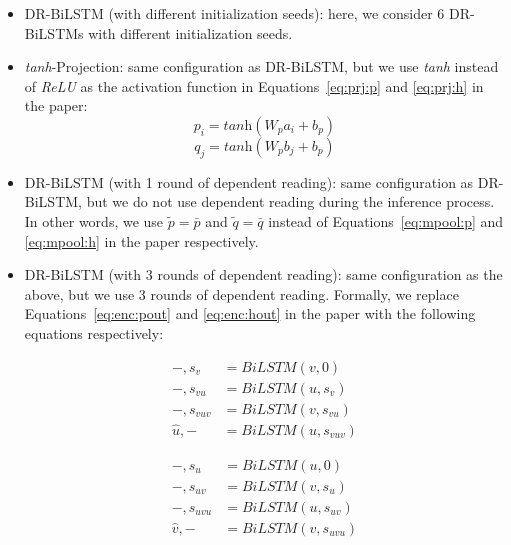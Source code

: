 \documentclass[11pt,a4paper]{article}
\begin{document}
	\begin{itemize}
		\item DR-BiLSTM (with different initialization seeds): here, we consider 6 DR-BiLSTMs with different initialization seeds.
		
		\item \emph{tanh}-Projection:  same configuration as DR-BiLSTM, but we use \emph{tanh} instead of \emph{ReLU} as the activation function in Equations~\ref{eq:prj:p} and \ref{eq:prj:h} in the paper:
		\begin{equation}
		p_i =  \textit{tanh}(W_p a_i + b_p)
		\end{equation}
		\begin{equation}
		q_j =  \textit{tanh}(W_p b_j + b_p)
		\end{equation}
		
		\item DR-BiLSTM (with 1 round of dependent reading): same configuration as DR-BiLSTM, but we do not use dependent reading during the inference process. In other words, we use $\tilde{p} = \bar{p}$ and $\tilde{q} = \bar{q}$ instead of Equations~\ref{eq:mpool:p} and \ref{eq:mpool:h} in the paper respectively.
		
		\item DR-BiLSTM (with 3 rounds of dependent reading): same configuration as the above, but we use 3 rounds of dependent reading. Formally, we replace Equations~\ref{eq:enc:pout} and \ref{eq:enc:hout} in the paper with the following equations respectively:
		
		\begin{equation}
		\begin{split}
		-, s_v &= \textit{BiLSTM}(v, 0) \\
		-, s_{vu} &= \textit{BiLSTM}(u, s_v) \\
		-, s_{vuv} &= \textit{BiLSTM}(v, s_{vu}) \\
		\hat{u}, - &= \textit{BiLSTM}(u, s_{vuv})
		\end{split}
		\label{eq:enc:rpout}
		\end{equation}
		
		\begin{equation}
		\begin{split}
		-, s_u &= \textit{BiLSTM}(u, 0) \\
		-, s_{uv} &= \textit{BiLSTM}(v, s_u) \\
		-, s_{uvu} &= \textit{BiLSTM}(u, s_{uv}) \\
		\hat{v}, - &= \textit{BiLSTM}(v, s_{uvu})
		\end{split}
		\label{eq:enc:rhout}
		\end{equation}
		
	\end{itemize}
	
\end{document}
